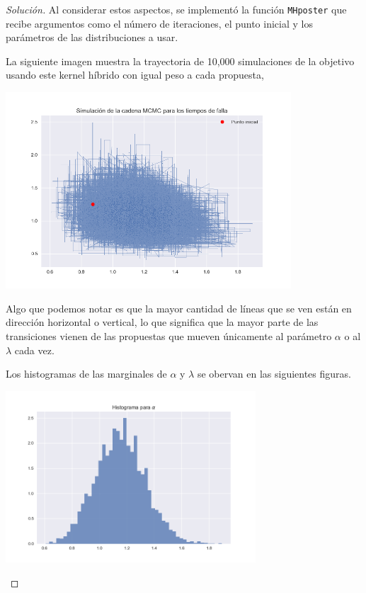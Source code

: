 \documentclass{article}
\begin{document}
\begin{enumerate}
\begin{proof}[Solución]
        Al considerar estos aspectos, se implementó la función \texttt{MHposter} que 
        recibe argumentos como el número de iteraciones, el punto inicial y los 
        parámetros de las distribuciones a usar. 

        La siguiente imagen muestra la trayectoria de 10,000 simulaciones de la objetivo usando este
        kernel híbrido con igual peso a cada propuesta,

        \begin{center}
            \includegraphics[width=0.8\textwidth]{Tarea8/traj2.png}
        \end{center}

        Algo que podemos notar es que la mayor cantidad de líneas que se ven están en
        dirección horizontal o vertical, lo que significa que la mayor parte de las
        transiciones vienen de las propuestas que mueven únicamente al parámetro 
        $\alpha$ o al $\lambda$ cada vez.

        Los histogramas de las marginales de $\alpha$ y $\lambda$ se obervan en las
        siguientes figuras.

        \begin{center}
            \includegraphics[width=0.7\textwidth]{Tarea8/hist21.png}
        \end{center}


\end{proof}
\end{enumerate}
\end{document}
